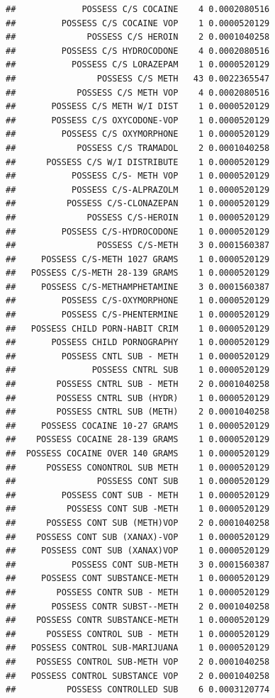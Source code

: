 \documentclass[]{book}
\begin{document}
\begin{verbatim}
##             POSSESS C/S COCAINE    4 0.0002080516
##         POSSESS C/S COCAINE VOP    1 0.0000520129
##              POSSESS C/S HEROIN    2 0.0001040258
##         POSSESS C/S HYDROCODONE    4 0.0002080516
##           POSSESS C/S LORAZEPAM    1 0.0000520129
##                POSSESS C/S METH   43 0.0022365547
##            POSSESS C/S METH VOP    4 0.0002080516
##       POSSESS C/S METH W/I DIST    1 0.0000520129
##       POSSESS C/S OXYCODONE-VOP    1 0.0000520129
##         POSSESS C/S OXYMORPHONE    1 0.0000520129
##            POSSESS C/S TRAMADOL    2 0.0001040258
##      POSSESS C/S W/I DISTRIBUTE    1 0.0000520129
##           POSSESS C/S- METH VOP    1 0.0000520129
##           POSSESS C/S-ALPRAZOLM    1 0.0000520129
##          POSSESS C/S-CLONAZEPAN    1 0.0000520129
##              POSSESS C/S-HEROIN    1 0.0000520129
##         POSSESS C/S-HYDROCODONE    1 0.0000520129
##                POSSESS C/S-METH    3 0.0001560387
##     POSSESS C/S-METH 1027 GRAMS    1 0.0000520129
##   POSSESS C/S-METH 28-139 GRAMS    1 0.0000520129
##     POSSESS C/S-METHAMPHETAMINE    3 0.0001560387
##         POSSESS C/S-OXYMORPHONE    1 0.0000520129
##         POSSESS C/S-PHENTERMINE    1 0.0000520129
##   POSSESS CHILD PORN-HABIT CRIM    1 0.0000520129
##       POSSESS CHILD PORNOGRAPHY    1 0.0000520129
##         POSSESS CNTL SUB - METH    1 0.0000520129
##               POSSESS CNTRL SUB    1 0.0000520129
##        POSSESS CNTRL SUB - METH    2 0.0001040258
##        POSSESS CNTRL SUB (HYDR)    1 0.0000520129
##        POSSESS CNTRL SUB (METH)    2 0.0001040258
##     POSSESS COCAINE 10-27 GRAMS    1 0.0000520129
##    POSSESS COCAINE 28-139 GRAMS    1 0.0000520129
##  POSSESS COCAINE OVER 140 GRAMS    1 0.0000520129
##      POSSESS CONONTROL SUB METH    1 0.0000520129
##                POSSESS CONT SUB    1 0.0000520129
##         POSSESS CONT SUB - METH    1 0.0000520129
##          POSSESS CONT SUB -METH    1 0.0000520129
##      POSSESS CONT SUB (METH)VOP    2 0.0001040258
##    POSSESS CONT SUB (XANAX)-VOP    1 0.0000520129
##     POSSESS CONT SUB (XANAX)VOP    1 0.0000520129
##           POSSESS CONT SUB-METH    3 0.0001560387
##     POSSESS CONT SUBSTANCE-METH    1 0.0000520129
##        POSSESS CONTR SUB - METH    1 0.0000520129
##       POSSESS CONTR SUBST--METH    2 0.0001040258
##    POSSESS CONTR SUBSTANCE-METH    1 0.0000520129
##      POSSESS CONTROL SUB - METH    1 0.0000520129
##   POSSESS CONTROL SUB-MARIJUANA    1 0.0000520129
##    POSSESS CONTROL SUB-METH VOP    2 0.0001040258
##   POSSESS CONTROL SUBSTANCE VOP    2 0.0001040258
##          POSSESS CONTROLLED SUB    6 0.0003120774

\end{verbatim}
\end{document}
